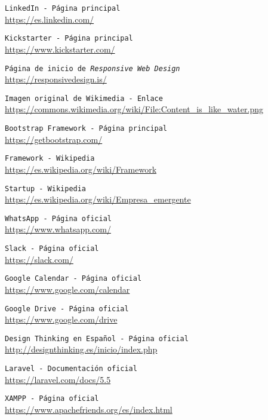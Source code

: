  {\tt LinkedIn - Página principal}\\
\url{https://es.linkedin.com/}

 {\tt Kickstarter - Página principal}\\
\url{https://www.kickstarter.com/}

 {\tt Página de inicio de \textit{Responsive Web Design}}\\
\url{https://responsivedesign.is/}

 {\tt Imagen original de Wikimedia - Enlace}\\
\url{https://commons.wikimedia.org/wiki/File:Content_is_like_water.png}

 {\tt Bootstrap Framework - Página principal}\\
\url{https://getbootstrap.com/}

 {\tt Framework - Wikipedia}\\
\url{https://es.wikipedia.org/wiki/Framework}

 {\tt Startup - Wikipedia}\\
\url{https://es.wikipedia.org/wiki/Empresa_emergente}

 {\tt WhatsApp - Página oficial}\\
\url{https://www.whatsapp.com/}

 {\tt Slack - Página oficial}\\
\url{https://slack.com/}

 {\tt Google Calendar - Página oficial}\\
\url{https://www.google.com/calendar}

 {\tt Google Drive - Página oficial}\\
\url{https://www.google.com/drive}

 {\tt Design Thinking en Español - Página oficial}\\
\url{http://designthinking.es/inicio/index.php}

 {\tt Laravel - Documentación oficial}\\
\url{https://laravel.com/docs/5.5}

 {\tt XAMPP - Página oficial}\\
\url{https://www.apachefriends.org/es/index.html}





















